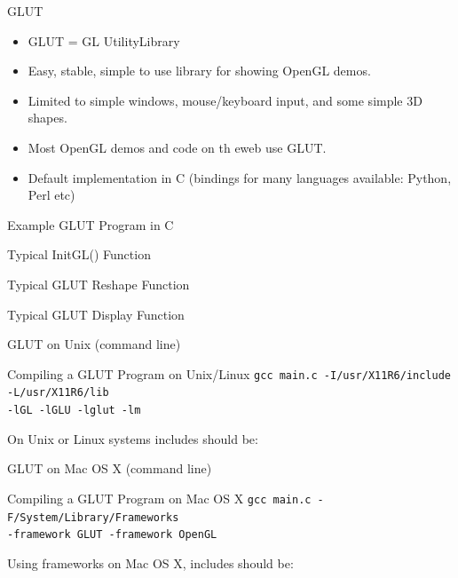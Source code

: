 \documentclass[xcolor=dvipsnames,t]{beamer}
\newcommand{\showcode}[1]{\begin{mdframed}[style=code] %
                          \end{mdframed}%
}
\begin{document}
\begin{frame}{GLUT} 
    \begin{itemize} 
        \item GLUT = GL UtilityLibrary
        \item Easy, stable, simple to use library for showing OpenGL demos.
        \item Limited to simple windows, mouse/keyboard input, and some simple 3D shapes.
        \item Most OpenGL demos and code on th eweb use GLUT.
        \item Default implementation in C
             (bindings for many languages available: Python, Perl etc)
    \end{itemize} 
\end{frame} 

\begin{frame}{Example GLUT Program in C} 
    \showcode{glutmain.c} 
\end{frame} 

\begin{frame}{Typical InitGL() Function} 
    \showcode{initgl.c} 
\end{frame} 

\begin{frame}{Typical GLUT Reshape Function} 
    \showcode{reshape.c} 
\end{frame} 

\begin{frame}{Typical GLUT Display Function} 
    \showcode{display.c} 
\end{frame} 

\begin{frame}{GLUT on Unix (command line)}
    \begin{block}{Compiling a GLUT Program on Unix/Linux}
    \small
    \texttt{gcc main.c -I/usr/X11R6/include -L/usr/X11R6/lib \\ -lGL -lGLU -lglut -lm}
   \normalsize
   \end{block} 

    On Unix or Linux systems includes should be:
    \showcode{unixincludes.c} 
\end{frame} 

\begin{frame}{GLUT on Mac OS X (command line) } 
    \begin{block}{Compiling a GLUT Program on Mac OS X} 
    \small
    \texttt{gcc main.c -F/System/Library/Frameworks  \\ -framework GLUT -framework OpenGL}
    \normalsize
    \end{block} 

    Using frameworks on Mac OS X, includes should be:
    \showcode{macincludes.c} 
\end{frame} 
\end{document}
